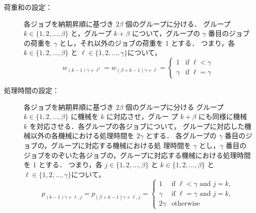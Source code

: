 \documentclass[12pt]{optlab-bachelor}
\begin{document}
\begin{description}
  \item[荷重和の設定：] 各ジョブを納期昇順に基づき $2\beta$ 個のグループに分ける．
  グループ $k \in \{1,2,\ldots,\beta\}$ と，グループ $k + \beta$ について，グループの $\gamma$ 番目のジョブの荷重を $\gamma$ とし，それ以外のジョブの荷重を 1 とする．
  つまり，各 $k \in \{1,2,\ldots, \beta\}$ と $\ell \in \{1,2,\ldots,
  \gamma\}$について，
  \begin{displaymath}
    w_{(k - 1)\gamma + \ell^v} = w_{(\beta + k - 1)\gamma + \ell} = \left\{ \begin{array}{ll} 1 & \text{if } \ell < \gamma \\ \gamma & \text{if } \ell = \gamma \end{array} \right.
  \end{displaymath}
  \item[処理時間の設定：] 各ジョブを納期昇順に基づき $2\beta$ 個のグループに分ける
  グループ $k \in \{1,2,\ldots,\beta\}$ に機械を $k$ に対応させ，グルー
  プ $k + \beta$ にも同様に機械 $k$ を対応させる．各グループの各ジョブについて， グループに対応した機械以外の各機械における処理時間を $2\gamma$ とする．
  各グループの $\gamma$ 番目のジョブの，グループに対応する機械における処
  理時間を $\gamma$ とし，$\gamma$ 番目のジョブをのぞいた各ジョブの，グループに対応する機械における処理時間を 1 とする．
  つまり，各 $j \in \{1,2,\ldots, \beta\}$ と $k \in \{1,2,\ldots,
  \beta\}$ と $\ell \in \{1,2,\ldots, \gamma\}$について，
  \begin{displaymath}
    p_{(k - 1)\gamma + \ell, j} = p_{(\beta + k - 1)\gamma + \ell, j} = \left\{ \begin{array}{ll} 1 & \text{if } \ell < \gamma \text{ and } j = k, \\ \gamma & \text{if } \ell = \gamma \text{ and } j = k, \\ 2\gamma & \text{otherwise}\end{array} \right.
  \end{displaymath}


\end{description}
\end{document}
